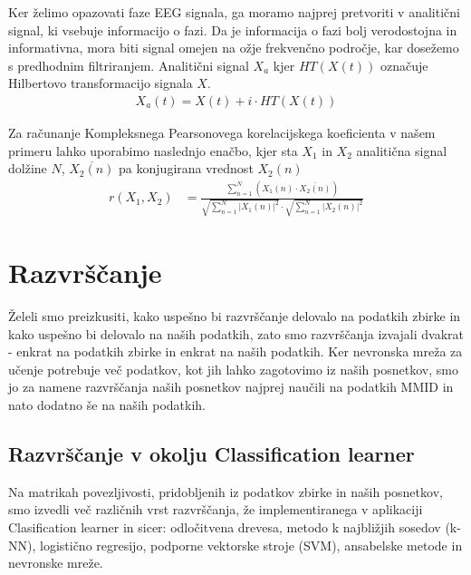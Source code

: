 Ker želimo opazovati faze EEG signala, ga moramo najprej pretvoriti v analitični signal, ki vsebuje informacijo o fazi. Da je informacija o fazi bolj verodostojna in informativna, mora biti signal omejen na ožje frekvenčno področje, kar dosežemo s predhodnim filtriranjem. Analitični signal $X_a$ kjer $HT(X(t))$ označuje Hilbertovo transformacijo signala $X$.\cite{sverkoComplexPearsonCorrelation2022} 
\begin{align*}
    X_a(t) = X(t) + i \cdot HT(X(t))
\end{align*}

Za računanje Kompleksnega Pearsonovega korelacijskega koeficienta v našem primeru lahko uporabimo naslednjo enačbo, kjer sta $X_1$ in $X_2$ analitična signal dolžine $N$, $\overline{X_2(n)}$ pa konjugirana vrednost $X_2(n)$ \cite{sverkoComplexPearsonCorrelation2022} 
\begin{align*}
r(X_1, X_2) &= \frac{\sum\limits_{n=1}^{N}(X_1(n) \cdot \overline{X_2(n)})}{\sqrt{\sum\limits_{n=1}^{N} |X_1(n)|^2} \cdot \sqrt{\sum\limits_{n=1}^{N} |X_2(n)|^2}}
\end{align*}

\section{Razvrščanje}
Želeli smo preizkusiti, kako uspešno bi razvrščanje delovalo na podatkih zbirke in kako uspešno bi delovalo na naših podatkih, zato smo razvrščanja izvajali dvakrat - enkrat na podatkih zbirke in enkrat na naših podatkih. Ker nevronska mreža za učenje potrebuje več podatkov, kot jih lahko zagotovimo iz naših posnetkov, smo jo za namene razvrščanja naših posnetkov najprej naučili na podatkih MMID in nato dodatno še na naših podatkih. 

\subsection{Razvrščanje v okolju Classification learner}
Na matrikah povezljivosti, pridobljenih iz podatkov zbirke in naših posnetkov, smo izvedli več različnih vrst razvrščanja, že implementiranega v aplikaciji Clasification learner in sicer: odločitvena drevesa, metodo k najbližjih sosedov (k-NN), logistično regresijo, podporne vektorske stroje (SVM), ansabelske metode in nevronske mreže.


